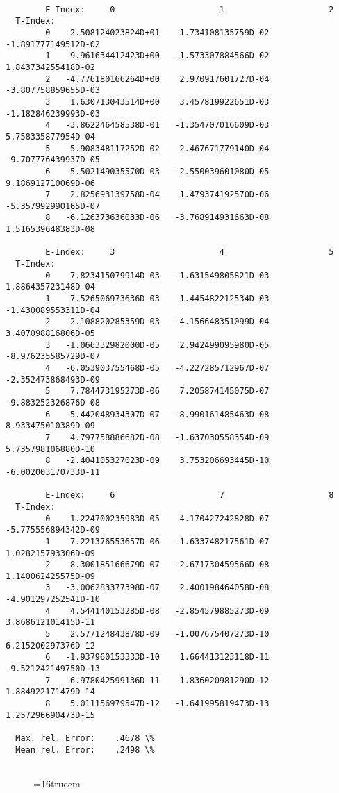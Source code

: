 \documentclass[12pt,dvipdfmx]{article}
\begin{document}
\begin{small}\begin{verbatim}

        E-Index:     0                     1                     2
  T-Index:
        0   -2.508124023824D+01    1.734108135759D-02   -1.891777149512D-02
        1    9.961634412423D+00   -1.573307884566D-02    1.843734255418D-02
        2   -4.776180166264D+00    2.970917601727D-04   -3.807758859655D-03
        3    1.630713043514D+00    3.457819922651D-03   -1.182846239993D-03
        4   -3.862246458538D-01   -1.354707016609D-03    5.758335877954D-04
        5    5.908348117252D-02    2.467671779140D-04   -9.707776439937D-05
        6   -5.502149035570D-03   -2.550039601080D-05    9.186912710069D-06
        7    2.825693139758D-04    1.479374192570D-06   -5.357992990165D-07
        8   -6.126373636033D-06   -3.768914931663D-08    1.516539648383D-08

        E-Index:     3                     4                     5
  T-Index:
        0    7.823415079914D-03   -1.631549805821D-03    1.886435723148D-04
        1   -7.526506973636D-03    1.445482212534D-03   -1.430089553311D-04
        2    2.108820285359D-03   -4.156648351099D-04    3.407098816806D-05
        3   -1.066332982000D-05    2.942499095980D-05   -8.976235585729D-07
        4   -6.053903755468D-05   -4.227285712967D-07   -2.352473868493D-09
        5    7.784473195273D-06    7.205874145075D-07   -9.883252326876D-08
        6   -5.442048934307D-07   -8.990161485463D-08    8.933475010389D-09
        7    4.797758886682D-08   -1.637030558354D-09    5.735798106880D-10
        8   -2.404105327023D-09    3.753206693445D-10   -6.002003170733D-11

        E-Index:     6                     7                     8
  T-Index:
        0   -1.224700235983D-05    4.170427242828D-07   -5.775556894342D-09
        1    7.221376553657D-06   -1.633748217561D-07    1.028215793306D-09
        2   -8.300185166679D-07   -2.671730459566D-08    1.140062425575D-09
        3   -3.006283377398D-07    2.400198464058D-08   -4.901297252541D-10
        4    4.544140153285D-08   -2.854579885273D-09    3.868612101415D-11
        5    2.577124843878D-09   -1.007675407273D-10    6.215200297376D-12
        6   -1.937960153333D-10    1.664413123118D-11   -9.521242149750D-13
        7   -6.978042599136D-11    1.836020981290D-12    1.884922171479D-14
        8    5.011156979547D-12   -1.641995819473D-13    1.257296690473D-15

  Max. rel. Error:    .4678 \%
  Mean rel. Error:    .2498 \%


\end{verbatim}\end{small}
\begin{figure} \label{2.1.5i}
\epsfxsize=16truecm
\end{figure}
\newpage
\end{document}
